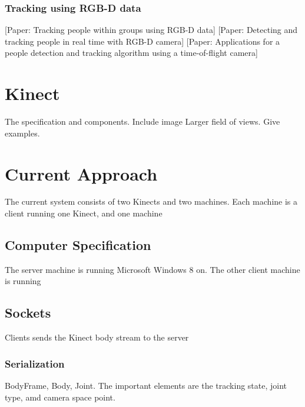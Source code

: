 \documentclass{sigchi}
\begin{document}
\cite{wei_kinect_calibration}
\cite{eggert_four_algorithms}
\cite{horn_unit_quaternions}

\subsubsection{Tracking using RGB-D data}

[Paper: Tracking people within groups using RGB-D data]
[Paper: Detecting and tracking people in real time with RGB-D camera]
[Paper: Applications for a people detection and tracking algorithm using a time-of-flight camera]

\section{Kinect}

The specification and components. Include image Larger field of views. Give examples.

\section{Current Approach}

The current system consists of two Kinects and two machines. Each machine is a client running one Kinect, and one machine 

\subsection{Computer Specification}

The server machine is running Microsoft Windows 8 on. The other client machine is running 

\subsection{Sockets}

Clients sends the Kinect body stream to the server

\subsubsection{Serialization}

BodyFrame, Body, Joint. The important elements are the tracking state, joint type, amd camera space point.

\cite{microsoft_kinect_namespace}
\cite{microsoft_kinect_coordinates}
\end{document}
